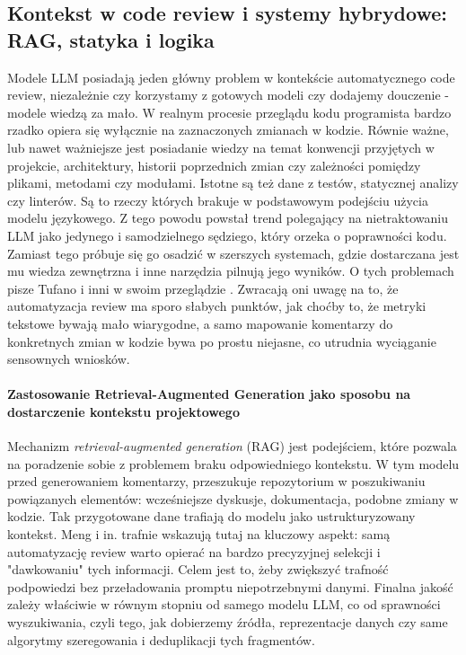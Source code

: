 \subsection{Kontekst w code review i systemy hybrydowe: RAG, statyka i logika}
\label{subsec:llm_acr_context_hybrid}

Modele LLM posiadają jeden główny problem w kontekście automatycznego code review, niezależnie czy
korzystamy z gotowych modeli czy dodajemy douczenie - modele wiedzą za mało. W realnym procesie przeglądu kodu
programista bardzo rzadko opiera się wyłącznie na zaznaczonych zmianach w kodzie. Równie ważne, lub nawet ważniejsze jest
posiadanie wiedzy na temat konwencji przyjętych w projekcie, architektury, historii poprzednich zmian czy zależności
pomiędzy plikami, metodami czy modułami. Istotne są też dane z testów, statycznej analizy czy linterów. Są to rzeczy
których brakuje w podstawowym podejściu użycia modelu językowego. Z tego powodu powstał trend polegający na nietraktowaniu
LLM jako jedynego i samodzielnego sędziego, który orzeka o poprawności kodu. Zamiast tego próbuje się go osadzić w szerszych
systemach, gdzie dostarczana jest mu wiedza zewnętrzna i inne narzędzia pilnują jego wyników. O tych problemach
pisze Tufano i inni w swoim przeglądzie \cite{Tufano2024CodeReviewAutomation}. Zwracają oni uwagę na to, że automatyzacja review ma sporo słabych punktów, jak 
choćby to, że metryki tekstowe bywają mało wiarygodne, a samo mapowanie komentarzy do konkretnych 
zmian w kodzie bywa po prostu niejasne, co utrudnia wyciąganie sensownych wniosków.

\paragraph{Zastosowanie Retrieval-Augmented Generation jako sposobu na dostarczenie kontekstu projektowego}
Mechanizm \emph{retrieval-augmented generation} (RAG) jest podejściem, które pozwala na poradzenie sobie z problemem
braku odpowiedniego kontekstu. W tym modelu przed generowaniem komentarzy, przeszukuje repozytorium w poszukiwaniu
powiązanych elementów: wcześniejsze dyskusje, dokumentacja, podobne zmiany w kodzie. Tak przygotowane dane
trafiają do modelu jako ustrukturyzowany kontekst. Meng i in. \cite{Meng2025RARe} trafnie wskazują tutaj na kluczowy aspekt:
samą automatyzację review warto opierać na bardzo precyzyjnej selekcji i "dawkowaniu" tych informacji. Celem jest to,
żeby zwiększyć trafność podpowiedzi bez przeładowania promptu niepotrzebnymi danymi. Finalna jakość zależy właściwie w
równym stopniu od samego modelu LLM, co od sprawności wyszukiwania, czyli tego, jak dobierzemy źródła, reprezentacje danych czy same algorytmy szeregowania 
i deduplikacji tych fragmentów.

